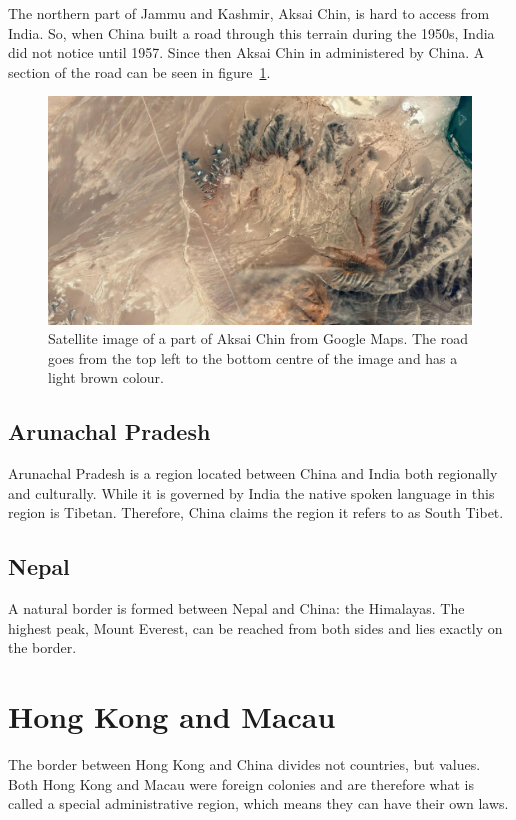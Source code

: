 \documentclass[conference]{IEEEtran}
\begin{document}
	The northern part of Jammu and Kashmir, Aksai Chin, is hard to access from India. So, when China built a road through this terrain during the 1950s, India did not notice until 1957. Since then Aksai Chin in administered by China. A section of the road can be seen in figure~\ref{pic:india_jammuAndKashmir_road}.
	
	\begin{figure}[t]
	\centering
	\includegraphics[width=\linewidth]{img/india_jammuAndKashmir_road.png}
	\caption{Satellite image of a part of Aksai Chin from Google Maps. The road goes from the top left to the bottom centre of the image and has a light brown colour.}
	\label{pic:india_jammuAndKashmir_road}
	\end{figure}
	
	\subsection{Arunachal Pradesh}
	Arunachal Pradesh is a region located between China and India both regionally and culturally. While it is governed by India the native spoken language in this region is Tibetan. Therefore, China claims the region it refers to as South Tibet.
	
	\subsection{Nepal}
	A natural border is formed between Nepal and China: the Himalayas. The highest peak, Mount Everest, can be reached from both sides and lies exactly on the border.
	
	\section{Hong Kong and Macau}
	The border between Hong Kong and China divides not countries, but values. Both Hong Kong and Macau were foreign colonies and are therefore what is called a special administrative region, which means they can have their own laws.
	
\end{document}
